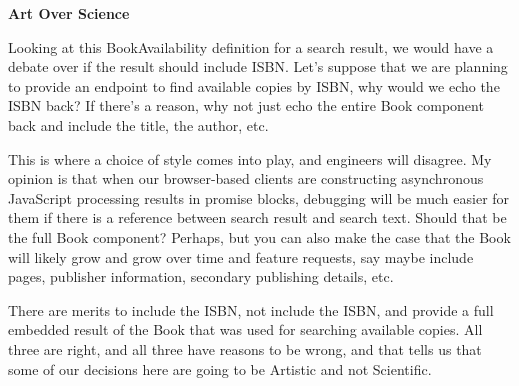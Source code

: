 \begin{sidebar}
\begin{center}
\textbf{Art Over Science}
\end{center}

Looking at this BookAvailability definition for a search result, we would have a debate over if the result should include ISBN.  Let's suppose that we are planning to provide an endpoint to find available copies by ISBN, why would we echo the ISBN back?  If there's a reason, why not just echo the entire Book component back and include the title, the author, etc.

This is where a choice of style comes into play, and engineers will disagree.  My opinion is that when our browser-based clients are constructing asynchronous JavaScript processing results in promise blocks, debugging will be much easier for them if there is a reference between search result and search text.  Should that be the full Book component?  Perhaps, but you can also make the case that the Book will likely grow and grow over time and feature requests, say maybe include pages, publisher information, secondary publishing details, etc.

There are merits to include the ISBN, not include the ISBN, and provide a full embedded result of the Book that was used for searching available copies.  All three are right, and all three have reasons to be wrong, and that tells us that some of our decisions here are going to be Artistic and not Scientific.
\end{sidebar}
